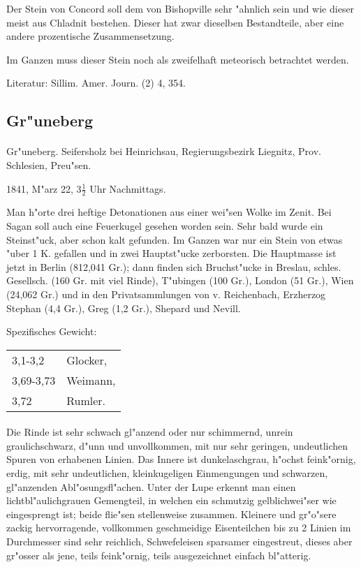 \documentclass[a4paper, 11pt, oneside]{article}
\begin{document}
Der Stein von Concord soll dem von Bishopville sehr "ahnlich sein und wie dieser meist aus Chladnit bestehen. Dieser hat zwar dieselben Bestandteile, aber eine andere prozentische Zusammensetzung.

Im Ganzen muss dieser Stein noch als zweifelhaft meteorisch betrachtet werden.

\footnotesize
Literatur: Sillim. Amer. Journ. (2) 4, 354.

\subsection{Gr"uneberg}
\normalsize
\paragraph{}
Gr"uneberg. Seifersholz bei Heinrichsau, Regierungsbezirk Liegnitz, Prov. Schlesien, Preu"sen.

1841, M"arz 22, $3\frac{1}{2}$ Uhr Nachmittags.

Man h"orte drei heftige Detonationen aus einer wei"sen Wolke im Zenit. Bei Sagan soll auch eine Feuerkugel gesehen worden sein. Sehr bald wurde ein Steinst"uck, aber schon kalt gefunden. Im Ganzen war nur ein Stein von etwas "uber 1 K. gefallen und in zwei Hauptst"ucke zerborsten. Die Hauptmasse ist jetzt in Berlin (812,041 Gr.); dann finden sich Bruchst"ucke in Breslau, schles. Gesellsch. (160 Gr. mit viel Rinde), T"ubingen (100 Gr.), London (51 Gr.), Wien (24,062 Gr.) und in den Privatsammlungen von v. Reichenbach, Erzherzog Stephan (4,4 Gr.), Greg (1,2 Gr.), Shepard und Nevill.

Spezifisches Gewicht:
\begin{table}[!ht]
    \centering
    \begin{tabular}{l l}
        3,1-3,2 & Glocker,\\
        3,69-3,73 & Weimann,\\
        3,72 & Rumler.
    \end{tabular}
\end{table}
\paragraph{}
Die Rinde ist sehr schwach gl"anzend oder nur schimmernd, unrein graulichschwarz, d"unn und unvollkommen, mit nur sehr geringen, undeutlichen Spuren von erhabenen Linien. Das Innere ist dunkelaschgrau, h"ochst feink"ornig, erdig, mit sehr undeutlichen, kleinkugeligen Einmengungen und schwarzen, gl"anzenden Abl"osungsfl"achen. Unter der Lupe erkennt man einen lichtbl"aulichgrauen Gemengteil, in welchen ein schmutzig gelblichwei"ser wie eingesprengt ist; beide flie"sen stellenweise zusammen. Kleinere und gr"o"sere zackig hervorragende, vollkommen geschmeidige Eisenteilchen bis zu 2 Linien im Durchmesser sind sehr reichlich, Schwefeleisen sparsamer eingestreut, dieses aber gr"osser als jene, teils feink"ornig, teils ausgezeichnet einfach bl"atterig.
\end{document}
